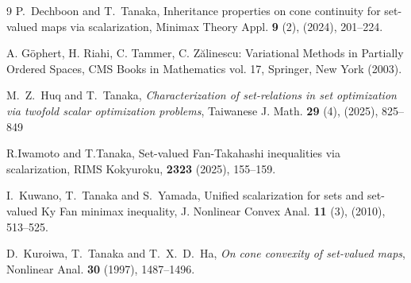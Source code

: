\documentclass[a4paper,11pt]{jsarticle}
\theoremstyle{definition}
\begin{document}
\begin{thebibliography}{9}
  P.~Dechboon and T.~Tanaka,
  Inheritance properties on cone continuity for set-valued maps via
  scalarization, Minimax Theory Appl. {\bf 9} (2), (2024), 201--224.

  A. G\"{o}phert, H. Riahi, C. Tammer, C. Z\u{a}linescu: Variational Methods in Partially Ordered
  Spaces, CMS Books in Mathematics vol. 17, Springer, New York (2003).

  M.\ Z.\ Huq and T.\ Tanaka, {\em Characterization of set-relations in set optimization via twofold scalar optimization problems},
  Taiwanese J. Math. {\bf29} (4), (2025), 825--849

  R.Iwamoto and T.Tanaka,
  Set-valued Fan-Takahashi inequalities via scalarization,
  RIMS Kokyuroku, {\bf 2323} (2025), 155--159.

  I.~Kuwano, T.~Tanaka and S.~Yamada,
  Unified scalarization for sets and set-valued Ky Fan minimax inequality,
  J. Nonlinear Convex Anal. {\bf 11} (3), (2010), 513--525.

  D.~Kuroiwa, T.~Tanaka and T.~X.~D.~Ha,
  {\em On cone convexity of set-valued maps},
  Nonlinear Anal.
    {\bf 30} (1997), 1487--1496.
\end{thebibliography}
\end{document}
